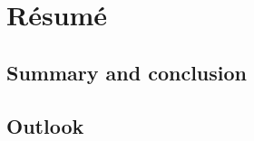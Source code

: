 \documentclass[twoside,a4paper]{article}
\begin{document}
%
%
\clearpage\newpage\null %
\newpage
\section{R\'esum\'e}
\subsection{Summary and conclusion}

\subsection{Outlook}
\end{document}
